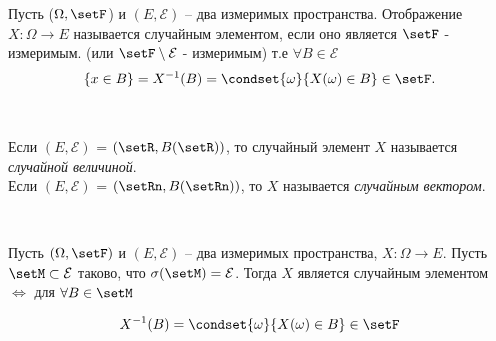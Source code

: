   
                  
\begin{definition}
	Пусть ($\Omega, \setF$) и $(E, \mathcal{E})$ -- два измеримых пространства. 
  Отображение $X\colon \Omega \to E$ называется случайным элементом,
   если оно является $\setF$ - измеримым. (или $\setF \setminus \mathcal{E}$ - измеримым) 
   т.е $\forall B \in \mathcal{E}$
  \begin{align*}
    \{ x \in B \} = X^{-1}(B) = \condset{\omega}{X(\omega) \in B} \in \setF.
  \end{align*}
\end{definition}

\begin{definition}~

  Если $(E, \mathcal{E})$ = $(\setR, B(\setR))$, то случайный элемент $X$ 
  называется \emph{случайной величиной}.\\

  Если $(E, \mathcal{E})$ = $(\setRn, B(\setRn))$, то $X$ называется \emph{случайным вектором}.\\
\end{definition}

\begin{lemma}~

  Пусть $(\Omega, \setF)$ и $(E, \mathcal{E})$ -- два измеримых пространства, 
  $X\colon \Omega \to E$.
  Пусть $\setM \subset \mathcal{E}$ таково, что $\sigma(\setM) = \mathcal{E}$. 
  Тогда $X$ является случайным элементом $\Leftrightarrow$ для $\forall B \in \setM$

  \begin{align*}
    X^{-1}(B) = \condset{\omega}{X(\omega) \in B} \in \setF
  \end{align*}

\end{lemma}

